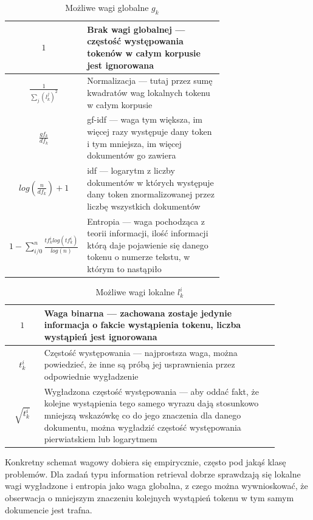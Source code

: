 \documentclass[11pt,a4paper]{article}
\begin{document}
\begin{table}[h]
\caption{Możliwe wagi globalne $g_k$}
\label{global-weights}
\begin{tabular}[c]{|c|p{0.7\linewidth}|}
\hline
$1$ & Brak wagi globalnej --- częstość występowania tokenów w całym korpusie jest ignorowana \\\hline
$\frac{1}{\sum_j (l^j_k)^2}$ & Normalizacja --- tutaj przez sumę kwadratów wag lokalnych tokenu w całym korpusie\\\hline
$\frac{gf_k}{df_k}$ & gf-idf --- waga tym większa, im więcej razy występuje dany token i tym mniejsza, im więcej dokumentów go zawiera\\\hline
$log(\frac{n}{df_k}) + 1$ & idf --- logarytm z liczby dokumentów w których występuje dany token znormalizowanej przez liczbę wszystkich dokumentów\\\hline
$1 - \sum_{i/0}^n \frac{tf^i_klog(tf^i_k)}{log(n)}$ & Entropia --- waga pochodząca z teorii informacji, ilość informacji którą daje pojawienie się danego tokenu o numerze tekstu, w którym to nastąpiło\\\hline
\end{tabular}
\end{table}

\begin{table}[h]
\caption{Możliwe wagi lokalne $l^i_k$}
\label{local-weights}
\begin{tabular}[c]{|c|p{0.875\linewidth}|}
\hline
$1$ & Waga binarna --- zachowana zostaje jedynie informacja o fakcie wystąpienia tokenu, liczba wystąpień jest ignorowana\\\hline
$t^i_k$ & Częstość występowania --- najprostsza waga, można powiedzieć, że inne są próbą jej usprawnienia przez odpowiednie wygładzenie\\\hline
$\sqrt{t^i_k}$ & Wygładzona częstość występowania --- aby oddać fakt, że kolejne wystąpienia tego samego wyrazu dają stosunkowo mniejszą wskazówkę co do jego znaczenia dla danego dokumentu, można wygładzić częstość występowania pierwiatskiem lub logarytmem\\\hline
\end{tabular}
\end{table}

Konkretny schemat wagowy dobiera się empirycznie, często pod jakąś klasę
problemów. Dla zadań typu information retrieval dobrze sprawdzają się lokalne
wagi wygładzone i entropia jako waga globalna, z czego można wywnioskować, że
obserwacja o mniejszym znaczeniu kolejnych wystąpień tokenu w tym samym
dokumencie jest trafna.
\end{document}
